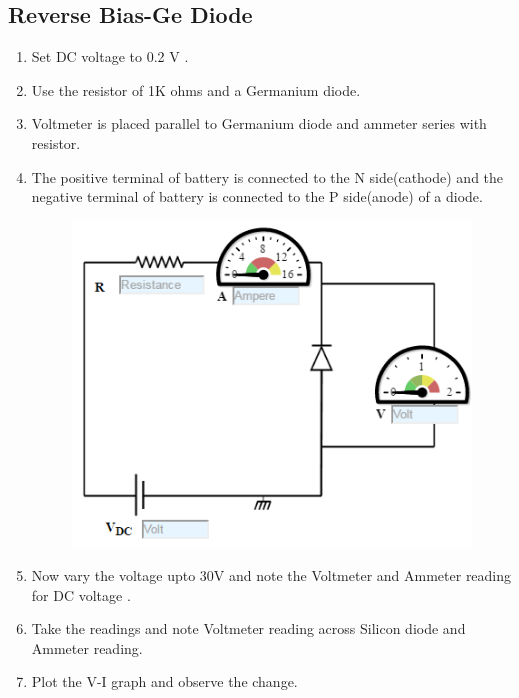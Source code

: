 		\subsection{Reverse Bias-Ge Diode}
			\begin{enumerate}
				\tightlist
				\item Set DC voltage to 0.2 V .
				\item Use the resistor of 1K ohms and a Germanium diode.
				\item Voltmeter is placed parallel to Germanium diode and ammeter series with resistor.
				\item The positive terminal of battery is connected to the N side(cathode) and the negative terminal of battery is connected to the P side(anode) of a diode.
				\begin{figure}[h]
					\centering
					\includegraphics[width=0.3\linewidth]{img/exp5/10}
					\caption{}
					\label{fig:pnjrpge}
				\end{figure}
				\item Now vary the voltage upto 30V and note the Voltmeter and Ammeter reading for DC voltage .
				\item Take the readings and note Voltmeter reading across Silicon diode and Ammeter reading.
				\item Plot the V-I graph and observe the change.
			\end{enumerate}

